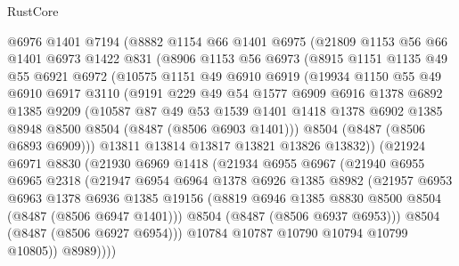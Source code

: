 \begin{lexlean}{RustCore}
\begin{coremodule}
    @6976
    @1401
    @7194
    (@8882
      @1154
      @66
      @1401
      @6975
      (@21809
        @1153
        @56
        @66
        @1401
        @6973
        @1422
        @831
        (@8906
          @1153
          @56
          @6973
          (@8915
            @1151
            @1135
            @49
            @55
            @6921
            @6972
            (@10575
              @1151
              @49
              @6910
              @6919
              (@19934
                @1150
                @55
                @49
                @6910
                @6917
                @3110
                (@9191
                  @229
                  @49
                  @54
                  @1577
                  @6909
                  @6916
                  @1378
                  @6892
                  @1385
                  @9209
                  (@10587
                    @87
                    @49
                    @53
                    @1539
                    @1401
                    @1418
                    @1378
                    @6902
                    @1385
                    @8948
                    @8500
                    @8504
                    (@8487 (@8506 @6903 @1401)))
                  @8504
                  (@8487 (@8506 @6893 @6909)))
                @13811
                @13814
                @13817
                @13821
                @13826
                @13832))
            (@21924
              @6971
              @8830
              (@21930
                @6969
                @1418
                (@21934
                  @6955
                  @6967
                  (@21940
                    @6955
                    @6965
                    @2318
                    (@21947
                      @6954
                      @6964
                      @1378
                      @6926
                      @1385
                      @8982
                      (@21957
                        @6953
                        @6963
                        @1378
                        @6936
                        @1385
                        @19156
                        (@8819 @6946 @1385 @8830 @8500 @8504 (@8487 (@8506 @6947 @1401)))
                        @8504
                        (@8487 (@8506 @6937 @6953)))
                      @8504
                      (@8487 (@8506 @6927 @6954)))
                    @10784
                    @10787
                    @10790
                    @10794
                    @10799
                    @10805))
                @8989))))

\end{coremodule}
\end{lexlean}
